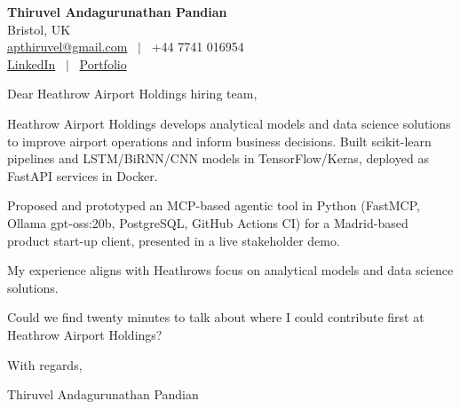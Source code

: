 \documentclass[11pt,a4paper]{article}
\begin{document}
\raggedright
\pagestyle{empty}

\begin{center}
    {\LARGE \color{linkblue} \textbf{Thiruvel Andagurunathan Pandian}}\\[0.2cm]
    Bristol, UK \\
    \href{mailto:apthiruvel@gmail.com}{apthiruvel@gmail.com} \ $|$ \ +44 7741 016954 \\
\href{https://www.linkedin.com/in/thiruvel-a-p/}{LinkedIn} \ $|$ \ \href{https://thiruvel-ap.github.io/PersonalPortfolio/}{Portfolio}
\end{center}

\vspace{0.4cm}

\noindent
Dear Heathrow Airport Holdings hiring team,

Heathrow Airport Holdings develops analytical models and data science solutions to improve airport operations and inform business decisions. Built scikit-learn pipelines and LSTM/BiRNN/CNN models in TensorFlow/Keras, deployed as FastAPI services in Docker.

Proposed and prototyped an MCP-based agentic tool in Python (FastMCP, Ollama gpt-oss:20b, PostgreSQL, GitHub Actions CI) for a Madrid-based product start-up client, presented in a live stakeholder demo.

My experience aligns with Heathrow\textquotesingle{}s focus on analytical models and data science solutions.

Could we find twenty minutes to talk about where I could contribute first at Heathrow Airport Holdings?

\vspace{0.5cm}

With regards,

Thiruvel Andagurunathan Pandian
\end{document}

